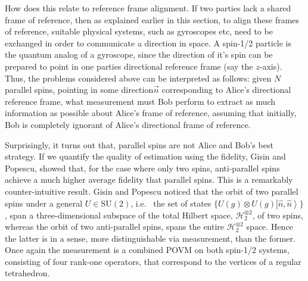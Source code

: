 \documentclass{article}
\newcommand{\ket}[1]{\left|#1\right\rangle}
\newcommand\cH{{\mathscr{H}}}
\begin{document}
How does this relate to reference frame alignment.  If two parties lack a shared frame of reference, then as explained earlier in this section, to align these frames of reference, suitable physical systems, such as gyroscopes etc, need to be exchanged in order to communicate a direction in space.  A spin-1/2 particle is the quantum analog of a gyroscope, since the direction of it's spin can be prepared to point in one parties directional reference frame (say the $z$-axis).  Thus, the problems considered above can be interpreted as follows:  given $N$ parallel spins, pointing in some direction$\vec{n}$ corresponding to Alice's directional reference frame, what measurement must Bob perform to extract as much information as possible about Alice's frame of reference, assuming that initially, Bob is completely ignorant of Alice's directional frame of reference.

Surprisingly, it turns out that, parallel spins are not Alice and Bob's best strategy.  If we quantify the quality of estimation using the fidelity, Gisin and Popescu, showed that, for the case where only two spins, anti-parallel spins achieve a much higher average fidelity that parallel spins.  This is a remarkably counter-intuitive result.  Gisin and Popescu noticed that the orbit of two parallel spins under a general $U\in\mathrm{SU}(2)$, i.e.~ the set of states $\{U(g)\otimes U(g)\ket{\hat{n},\hat{n}}\}$, span a three-dimensional subspace of the total Hilbert space, $\cH_2^{\otimes 2}$, of two spins, whereas the orbit of two anti-parallel spins, spans the entire $\cH_2^{\otimes 2}$ space.  Hence the latter is in a sense, more distinguishable via measurement, than the former.  Once again the measurement is a combined POVM on both spin-1/2 systems, consisting of four rank-one operators, that correspond to the vertices of a regular tetrahedron.
\end{document}
